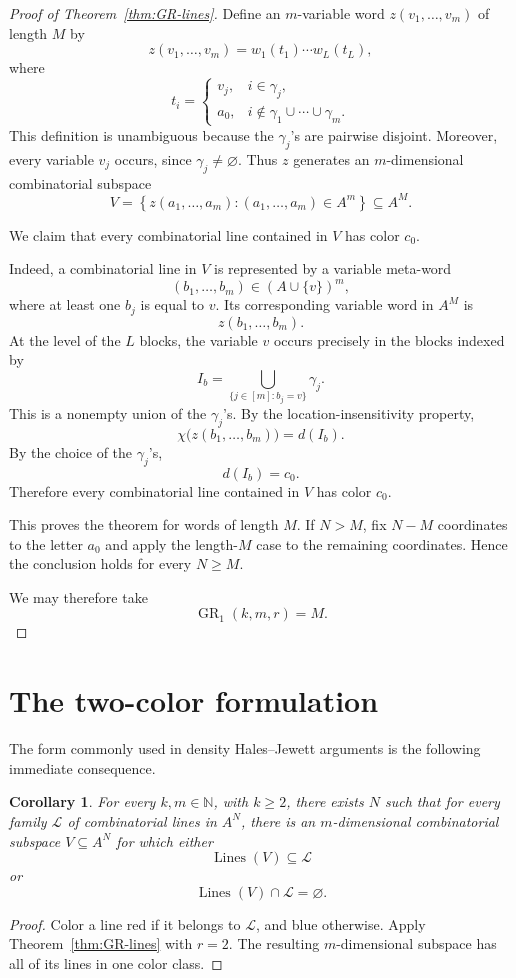 \documentclass[11pt]{article}
\newtheorem{corollary}[theorem]{Corollary}
\newcommand{\N}{\mathbb N}
\begin{document}
\begin{proof}[Proof of Theorem~\ref{thm:GR-lines}]
  Define an \(m\)-variable word \(z(v_1,\dots,v_m)\) of length \(M\) by
  \[
    z(v_1,\dots,v_m)
    =
    w_1(t_1)\cdots w_L(t_L),
  \]
  where
  \[
    t_i=
    \begin{cases}
      v_j,& i\in\gamma_j,\\
      a_0,&
      i\notin\gamma_1\cup\cdots\cup\gamma_m.
    \end{cases}
  \]
  This definition is unambiguous because the \(\gamma_j\)'s are
  pairwise disjoint. Moreover, every variable \(v_j\) occurs, since
  \(\gamma_j\neq\varnothing\). Thus \(z\) generates an
  \(m\)-dimensional combinatorial subspace
  \[
    V
    =
    \left\{
      z(a_1,\dots,a_m):
      (a_1,\dots,a_m)\in A^m
    \right\}
    \subseteq A^M.
  \]

  We claim that every combinatorial line contained in \(V\) has color
  \(c_0\).

  Indeed, a combinatorial line in \(V\) is represented by a variable
  meta-word
  \[
    (b_1,\dots,b_m)\in(A\cup\{v\})^m,
  \]
  where at least one \(b_j\) is equal to \(v\). Its corresponding
  variable word in \(A^M\) is
  \[
    z(b_1,\dots,b_m).
  \]
  At the level of the \(L\) blocks, the variable \(v\) occurs precisely
  in the blocks indexed by
  \[
    I_b
    =
    \bigcup_{\{j\in[m]:b_j=v\}}\gamma_j.
  \]
  This is a nonempty union of the \(\gamma_j\)'s. By the
  location-insensitivity property,
  \[
    \chi\bigl(z(b_1,\dots,b_m)\bigr)=d(I_b).
  \]
  By the choice of the \(\gamma_j\)'s,
  \[
    d(I_b)=c_0.
  \]
  Therefore every combinatorial line contained in \(V\) has color
  \(c_0\).

  This proves the theorem for words of length \(M\). If \(N>M\), fix
  \(N-M\) coordinates to the letter \(a_0\) and apply the length-\(M\)
  case to the remaining coordinates. Hence the conclusion holds for
  every \(N\geq M\).

  We may therefore take
  \[
    \operatorname{GR}_1(k,m,r)=M.
  \]
\end{proof}

\section{The two-color formulation}

The form commonly used in density Hales--Jewett arguments is the
following immediate consequence.

\begin{corollary}
  \label{cor:family-lines}
  For every \(k,m\in\N\), with \(k\geq2\), there exists \(N\) such that
  for every family \(\mathcal L\) of combinatorial lines in \(A^N\),
  there is an \(m\)-dimensional combinatorial subspace \(V\subseteq A^N\)
  for which either
  \[
    \operatorname{Lines}(V)\subseteq\mathcal L
  \]
  or
  \[
    \operatorname{Lines}(V)\cap\mathcal L=\varnothing.
  \]
\end{corollary}

\begin{proof}
  Color a line red if it belongs to \(\mathcal L\), and blue otherwise.
  Apply Theorem~\ref{thm:GR-lines} with \(r=2\). The resulting
  \(m\)-dimensional subspace has all of its lines in one color class.
\end{proof}
\end{document}
